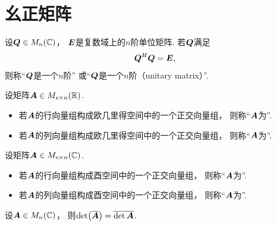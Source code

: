 \section{幺正矩阵}
\begin{definition}\label{definition:幺正矩阵.幺正矩阵的定义}
设\(\boldsymbol{Q} \in M_n(\mathbb{C})\)，
\(\boldsymbol{E}\)是复数域上的\(n\)阶单位矩阵.
若\(\boldsymbol{Q}\)满足\begin{equation}\label{equation:幺正矩阵.幺正矩阵的定义式}
	\boldsymbol{Q}^H \boldsymbol{Q} = \boldsymbol{E},
\end{equation}
则称“\(\boldsymbol{Q}\)是一个\(n\)阶”
或“\(\boldsymbol{Q}\)是一个\(n\)阶（unitary matrix）”.
\end{definition}

\begin{definition}
设矩阵\(\boldsymbol{A} \in M_{s \times n}(\mathbb{R})\).
\begin{itemize}
	\item 若\(\boldsymbol{A}\)的行向量组构成欧几里得空间中的一个正交向量组，
	则称“\(\boldsymbol{A}\)为”.
	\item 若\(\boldsymbol{A}\)的列向量组构成欧几里得空间中的一个正交向量组，
	则称“\(\boldsymbol{A}\)为”.
\end{itemize}
\end{definition}

\begin{definition}
设矩阵\(\boldsymbol{A} \in M_{s \times n}(\mathbb{C})\).
\begin{itemize}
	\item 若\(\boldsymbol{A}\)的行向量组构成酉空间中的一个正交向量组，
	则称“\(\boldsymbol{A}\)为”.
	\item 若\(\boldsymbol{A}\)的列向量组构成酉空间中的一个正交向量组，
	则称“\(\boldsymbol{A}\)为”.
\end{itemize}
\end{definition}

\begin{lemma}
设\(\boldsymbol{A} \in M_n(\mathbb{C})\)，
则\(\det(\overline{\boldsymbol{A}}) = \overline{\det\boldsymbol{A}}\).
\end{lemma}

